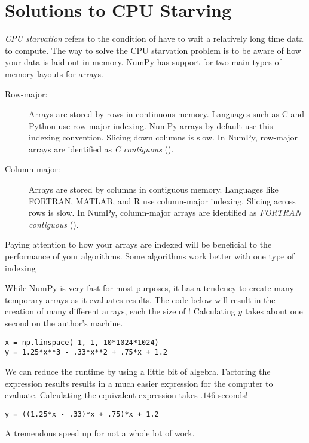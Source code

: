 \section*{Solutions to CPU Starving}
\emph{CPU starvation} refers to the condition of have to wait a relatively long time data to compute.
The way to solve the CPU starvation problem is to be aware of how your data is laid out in memory.
NumPy has support for two main types of memory layouts for arrays.
\begin{description}
\item[Row-major:] Arrays are stored by rows in continuous memory.
Languages such as C and Python use row-major indexing.  NumPy arrays by default use this indexing convention.
Slicing down columns is slow.  In NumPy, row-major arrays are identified as \emph{C contiguous} ().
\item[Column-major:] Arrays are stored by columns in contiguous memory.
Languages like FORTRAN, MATLAB, and R use column-major indexing.  Slicing across rows is slow.
In NumPy, column-major arrays are identified as \emph{FORTRAN contiguous} ().
\end{description}
Paying attention to how your arrays are indexed will be beneficial to the performance of your algorithms.
Some algorithms work better with one type of indexing

While NumPy is very fast for most purposes, it has a tendency to create many temporary arrays as it evaluates results.
The code below will result in the creation of many different arrays, each the size of !
Calculating $y$ takes about one second on the author's machine.
\begin{lstlisting}
x = np.linspace(-1, 1, 10*1024*1024)
y = 1.25*x**3 - .33*x**2 + .75*x + 1.2
\end{lstlisting}
We can reduce the runtime by using a little bit of algebra.
Factoring the expression results results in a much easier expression for the computer to evaluate.
Calculating the equivalent expression takes $.146$ seconds!
\begin{lstlisting}
y = ((1.25*x - .33)*x + .75)*x + 1.2
\end{lstlisting}
A tremendous speed up for not a whole lot of work.

